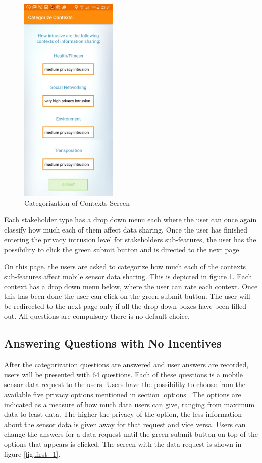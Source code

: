 \begin{figure}[ht!]
\centering
\includegraphics[width=0.4\linewidth, height=10cm]{./images/cat_contexts}
\caption{Categorization of Contexts Screen}
\label{fig:cat_co}
\end{figure}

Each stakeholder type has a drop
down menu each where the user can once again classify how much each of them affect data sharing.
Once the user has finished entering the privacy intrusion level for stakeholders sub-features, the user has the possibility to click the green submit button and is directed to the next page.


On this page, the users are asked to categorize how much each of the contexts sub-features affect mobile sensor data sharing. This is depicted in figure \ref{fig:cat_co}. Each context has a drop down menu below, where the user can rate each context. Once this has been done the user can click on the green submit button. The user will be redirected to the next page only if all the drop down boxes have been filled out. All questions are compulsory there is no default choice.

\subsection{Answering Questions with No Incentives}  \label{quest_wi}
After the categorization questions are answered and user answers are recorded, users will be presented with 64 questions. Each of these questions is a mobile sensor data request
to the users. Users have the possibility to choose from the available five privacy options mentioned in section \ref{options}. The options are indicated as a measure of how much data users can give, ranging from maximum data to least data. The higher the privacy of the option, the less information about the sensor data is given away for that request and vice versa. Users can change the answers for a data request until the green submit button on top of the options that appears is clicked. The screen with the data request is shown in figure \ref{fig:first_1}. 


